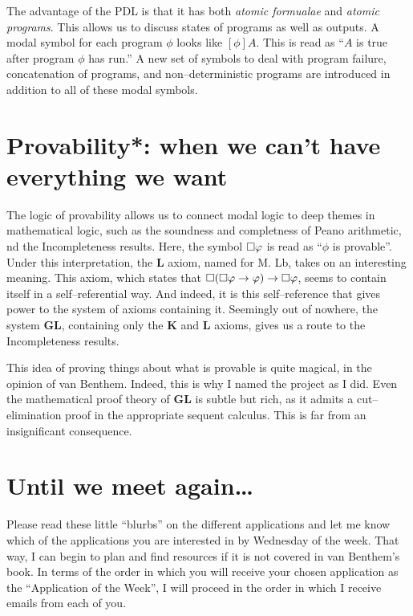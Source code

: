 The advantage of the PDL is that it has both \emph{atomic formualae} and \emph{atomic programs}. This allows us to discuss states of programs
as well as outputs. A modal symbol for each program $\phi$ looks like $[\phi]A$. This is read as ``$A$ is true after program $\phi$ has run.''
A new set of symbols to deal with program failure, concatenation of programs, and non--deterministic programs are introduced in addition to all
of these modal symbols.

\section{Provability*: when we can't have everything we want}
The logic of provability allows us to connect modal logic to deep themes in mathematical logic, such as the soundness and completness of Peano arithmetic,
nd the Incompleteness results. Here, the symbol $\square \varphi$ is read as ``$\phi$ is provable''. Under this interpretation, the 
\textbf{L} axiom, named for M. Lb, takes on an interesting meaning. This axiom, which states that $\square (\square \varphi \rightarrow
\varphi) \rightarrow \square \varphi$, seems to contain itself in a self--referential way. And indeed, it is this self--reference that gives power
to the system of axioms containing it. Seemingly out of nowhere, the system \textbf{GL}, containing only the \textbf{K} and \textbf{L} axioms,
gives us a route to the Incompleteness results.

This idea of proving things about what is provable is quite magical, in the opinion of van Benthem. Indeed, this is why I named the project as I did.
Even the mathematical proof theory of \textbf{GL} is subtle but rich, as it admits a cut--elimination proof in the appropriate sequent calculus.
This is far from an insignificant consequence.

\section{Until we meet again\dots}

Please read these little ``blurbs'' on the different applications and
let me know which of the applications you are interested in by Wednesday of the
week. That way, I can begin to plan and find resources if it is not covered in van
Benthem's book. In terms of the order in which you will receive your chosen application as the ``Application of the Week'',
I will proceed in the order in which I receive emails from each of you. 